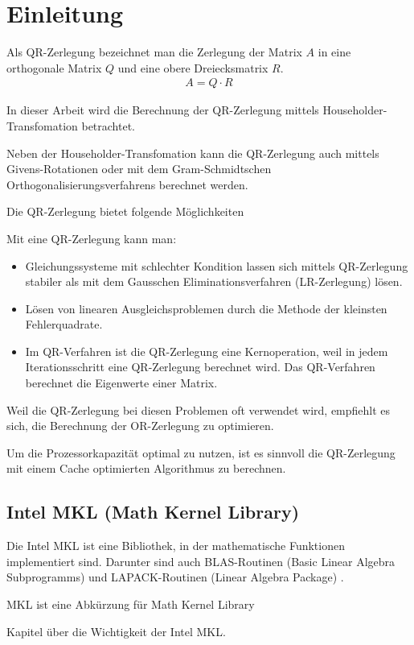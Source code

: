 \chapter{Einleitung}
Als QR-Zerlegung bezeichnet man die Zerlegung der Matrix $A$ in eine  orthogonale Matrix $Q$ und eine obere Dreiecksmatrix $R$.
\begin{align*}
	A = Q \cdot R
\end{align*} 

In dieser Arbeit wird die Berechnung der QR-Zerlegung mittels Householder-Transfomation betrachtet. 

Neben der Householder-Transfomation kann die QR-Zerlegung auch mittels Givens-Rotationen oder mit dem Gram-Schmidtschen Orthogonalisierungsverfahrens berechnet werden.

Die QR-Zerlegung bietet folgende Möglichkeiten

Mit eine QR-Zerlegung kann man:
\begin{itemize}
	\item Gleichungssysteme mit schlechter Kondition lassen sich mittels QR-Zerlegung stabiler als mit dem Gausschen Eliminationsverfahren (LR-Zerlegung) lösen. 

	\item Lösen von linearen Ausgleichsproblemen durch die Methode der kleinsten Fehlerquadrate.
	
	\item Im QR-Verfahren ist die QR-Zerlegung eine Kernoperation, weil in jedem Iterationsschritt eine QR-Zerlegung berechnet wird.
	Das QR-Verfahren berechnet die Eigenwerte einer Matrix.	
\end{itemize}

Weil die QR-Zerlegung bei diesen Problemen oft verwendet wird, empfiehlt es sich, die Berechnung der OR-Zerlegung zu optimieren.



Um die Prozessorkapazität optimal zu nutzen, ist es sinnvoll die QR-Zerlegung mit einem Cache optimierten Algorithmus zu berechnen.


\section{Intel MKL (Math Kernel Library)}

Die Intel MKL ist eine Bibliothek, in der mathematische Funktionen implementiert sind. Darunter sind auch BLAS-Routinen (Basic Linear Algebra Subprogramms) und LAPACK-Routinen (Linear Algebra Package) \cite{DGEQR2}.



MKL ist eine Abkürzung für Math Kernel Library 

Kapitel über die Wichtigkeit der Intel MKL.

